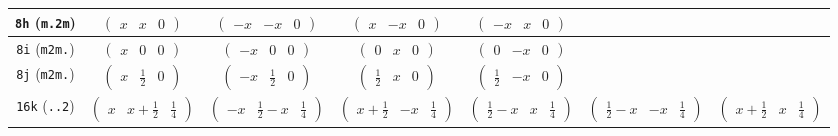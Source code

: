 \documentclass[fleqn,9pt,landscape]{jsarticle}
\begin{document}
\begin{center}
\begin{longtable}{ccccccc}
{\tt 8h} ({\tt m.2m}) & $ \begin{pmatrix} x & x & 0 \end{pmatrix} $ & $ \begin{pmatrix} - x & - x & 0 \end{pmatrix} $ & $ \begin{pmatrix} x & - x & 0 \end{pmatrix} $ & $ \begin{pmatrix} - x & x & 0 \end{pmatrix} $ & $  $ & $  $ \\ \hline
{\tt 8i} ({\tt m2m.}) & $ \begin{pmatrix} x & 0 & 0 \end{pmatrix} $ & $ \begin{pmatrix} - x & 0 & 0 \end{pmatrix} $ & $ \begin{pmatrix} 0 & x & 0 \end{pmatrix} $ & $ \begin{pmatrix} 0 & - x & 0 \end{pmatrix} $ & $  $ & $  $ \\ \hline
{\tt 8j} ({\tt m2m.}) & $ \begin{pmatrix} x & \frac{1}{2} & 0 \end{pmatrix} $ & $ \begin{pmatrix} - x & \frac{1}{2} & 0 \end{pmatrix} $ & $ \begin{pmatrix} \frac{1}{2} & x & 0 \end{pmatrix} $ & $ \begin{pmatrix} \frac{1}{2} & - x & 0 \end{pmatrix} $ & $  $ & $  $ \\ \hline
{\tt 16k} ({\tt ..2}) & $ \begin{pmatrix} x & x + \frac{1}{2} & \frac{1}{4} \end{pmatrix} $ & $ \begin{pmatrix} - x & \frac{1}{2} - x & \frac{1}{4} \end{pmatrix} $ & $ \begin{pmatrix} x + \frac{1}{2} & - x & \frac{1}{4} \end{pmatrix} $ & $ \begin{pmatrix} \frac{1}{2} - x & x & \frac{1}{4} \end{pmatrix} $ & $ \begin{pmatrix} \frac{1}{2} - x & - x & \frac{1}{4} \end{pmatrix} $ & $ \begin{pmatrix} x + \frac{1}{2} & x & \frac{1}{4} \end{pmatrix} $ \\

\end{longtable}
\end{center}
\end{document}
